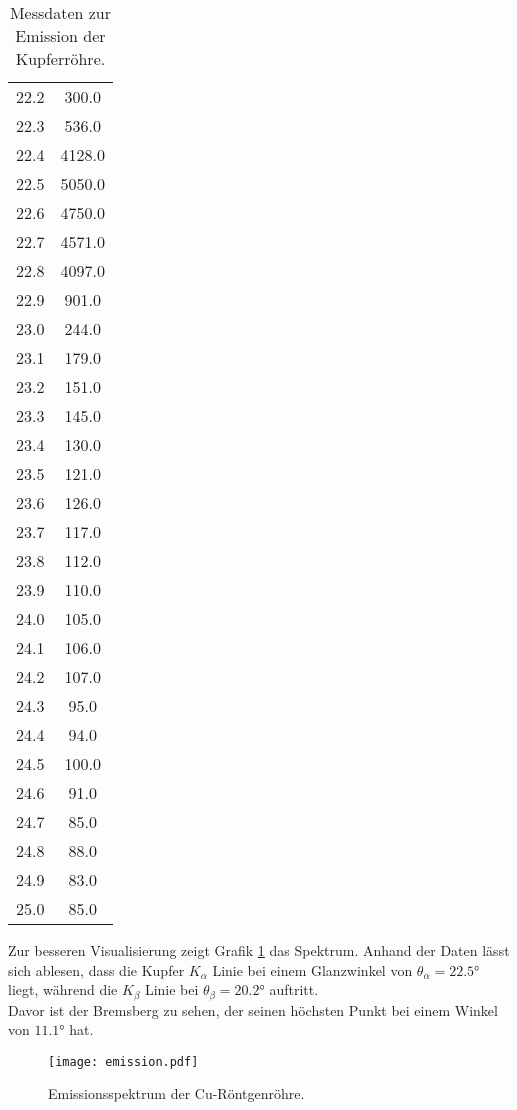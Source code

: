 \begin{table}
\begin{tabular}{c c}
        22.2	&	300.0\\
        22.3	&	536.0\\
        22.4	&	4128.0\\
        22.5	&	5050.0\\
        22.6	&	4750.0\\
        22.7	&	4571.0\\
        22.8	&	4097.0\\
        22.9	&	901.0\\
        23.0	&	244.0\\
        23.1	&	179.0\\
        23.2	&	151.0\\
        23.3	&	145.0\\
        23.4	&	130.0\\
        23.5	&	121.0\\
        23.6	&	126.0\\
        23.7	&	117.0\\
        23.8	&	112.0\\
        23.9	&	110.0\\
        24.0	&	105.0\\
        24.1	&	106.0\\
        24.2	&	107.0\\
        24.3	&	95.0 \\
        24.4	&	94.0\\
        24.5	&	100.0\\
        24.6	&	91.0\\
        24.7	&	85.0\\
        24.8	&	88.0\\
        24.9	&	83.0\\
        25.0	&	85.0\\
        \bottomrule
    \end{tabular}
    \caption{Messdaten zur Emission der Kupferröhre.}
    \label{tab:emiss}
\end{table}

\noindent Zur besseren Visualisierung zeigt Grafik \ref{fig:emission}
das Spektrum. Anhand der Daten lässt sich ablesen, dass die Kupfer 
$K_\alpha$ Linie bei einem Glanzwinkel von $\theta_\alpha = 22.5 °$ liegt,
während die $K_\beta$ Linie bei $\theta_\beta = 20.2 °$ auftritt.\\
Davor ist der Bremsberg zu sehen, der seinen höchsten Punkt bei einem
Winkel von $11.1 °$ hat. 

\begin{figure}
    \centering
    \texttt{[image: emission.pdf]}
    \caption{Emissionsspektrum der Cu-Röntgenröhre.}
    \label{fig:emission}
\end{figure}

